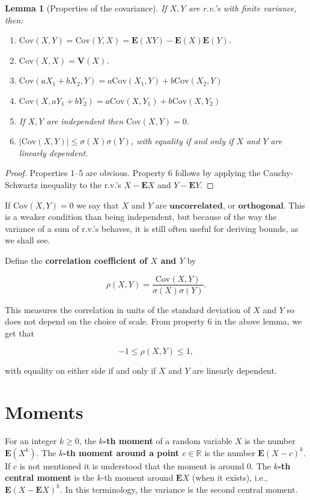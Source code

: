 \documentclass[11pt]{report}
\newcommand{\R}{\mathbb{R}}
\theoremstyle{plain}
\newtheorem{lem}[thm]{Lemma}
\theoremstyle{definition}
\begin{document}
\begin{lem}[Properties of the covariance]
If $X,Y$ are r.v.'s with finite variance, then:

\begin{enumerate}[label=\arabic*.]
\item $\textrm{Cov}(X,Y)=\textrm{Cov}(Y,X) = \mathbf{E}(XY)
- \mathbf{E}(X) \mathbf{E}(Y)$.

\item $\textrm{Cov}(X,X) = \mathbf{V}(X)$.

\item $\textrm{Cov}(aX_1+bX_2,Y) =
a\textrm{Cov}(X_1,Y)+b\textrm{Cov}(X_2,Y)$

\item $\textrm{Cov}(X,aY_1+bY_2) =
a\textrm{Cov}(X,Y_1)+b\textrm{Cov}(X,Y_2)$

\item If $X,Y$ are independent then $\textrm{Cov}(X,Y)=0$.

\item $|\textrm{Cov}(X,Y)| \le \sigma(X) \sigma(Y)$, with
equality if and only if $X$ and $Y$ are linearly
dependent.
\end{enumerate}

\end{lem}

\begin{proof}
Properties 1--5 are obvious. Property 6 follows by
applying the Cauchy-Schwartz inequality to the r.v.'s
$X-\mathbf{E} X$ and $Y-\mathbf{E} Y$.
\end{proof}

If $\textrm{Cov}(X,Y)=0$ we say that $X$ and $Y$ are
$\textbf{uncorrelated}$, or $\textbf{orthogonal}$.
This is a weaker condition than being independent, but
because of the way the variance of a sum of r.v.'s
behaves, it is still often useful for deriving bounds,
as we shall see.

Define the \textbf{correlation coefficient of $X$ and $Y$}
by

\[
\rho(X,Y) = \frac{\textrm{Cov}(X,Y)}{\sigma(X)\sigma(Y)}.
\]

This measures the correlation in units of the
standard deviation of $X$ and $Y$ so does not depend
on the choice of scale. From property 6 in the above
lemma, we get that

\[
-1\le \rho(X,Y)\le 1,
\]

with equality on either side if and only if $X$ and
$Y$ are linearly dependent.

\section{Moments}
For an integer $k\ge 0$, the \textbf{$k$-th moment} of a
random variable $X$ is the number $\mathbf{E}(X^k)$.
The \textbf{$k$-th moment around a point $c\in\R$} is the
number $\mathbf{E}(X-c)^k$. If $c$ is not mentioned
it is understood that the moment is around 0. The
\textbf{$k$-th central moment} is the $k$-th moment around
$\mathbf{E} X$ (when it exists), i.e.,
$\mathbf{E}(X-\mathbf{E} X)^k$. In this terminology,
the variance is the second central moment.
\end{document}
